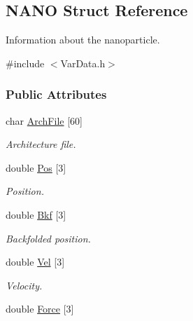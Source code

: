 \hypertarget{structNANO}{\subsection{\-N\-A\-N\-O \-Struct \-Reference}
\label{structNANO}
}


\-Information about the nanoparticle.  




{\ttfamily \#include $<$\-Var\-Data.\-h$>$}

\subsubsection*{\-Public \-Attributes}
\begin{DoxyCompactItemize}
\item 
\hypertarget{structNANO_a750f14eafb9dc7737d8524501eeef457}{char \hyperlink{structNANO_a750f14eafb9dc7737d8524501eeef457}{\-Arch\-File} \mbox{[}60\mbox{]}}\label{structNANO_a750f14eafb9dc7737d8524501eeef457}

\begin{DoxyCompactList}\small\item\em \-Architecture file. \end{DoxyCompactList}\item 
\hypertarget{structNANO_a863738e46f14b3bfc674ad87d35f143d}{double \hyperlink{structNANO_a863738e46f14b3bfc674ad87d35f143d}{\-Pos} \mbox{[}3\mbox{]}}\label{structNANO_a863738e46f14b3bfc674ad87d35f143d}

\begin{DoxyCompactList}\small\item\em \-Position. \end{DoxyCompactList}\item 
\hypertarget{structNANO_a77abbc20fd99f1fb464e7a922e543e19}{double \hyperlink{structNANO_a77abbc20fd99f1fb464e7a922e543e19}{\-Bkf} \mbox{[}3\mbox{]}}\label{structNANO_a77abbc20fd99f1fb464e7a922e543e19}

\begin{DoxyCompactList}\small\item\em \-Backfolded position. \end{DoxyCompactList}\item 
\hypertarget{structNANO_ae3fae9edc78d8cadc33c5a52bebdb46c}{double \hyperlink{structNANO_ae3fae9edc78d8cadc33c5a52bebdb46c}{\-Vel} \mbox{[}3\mbox{]}}\label{structNANO_ae3fae9edc78d8cadc33c5a52bebdb46c}

\begin{DoxyCompactList}\small\item\em \-Velocity. \end{DoxyCompactList}\item 
\hypertarget{structNANO_ad597aadcc443ffa959ac837ba5382bff}{double \hyperlink{structNANO_ad597aadcc443ffa959ac837ba5382bff}{\-Force} \mbox{[}3\mbox{]}}\label{structNANO_ad597aadcc443ffa959ac837ba5382bff}


\end{DoxyCompactItemize}
